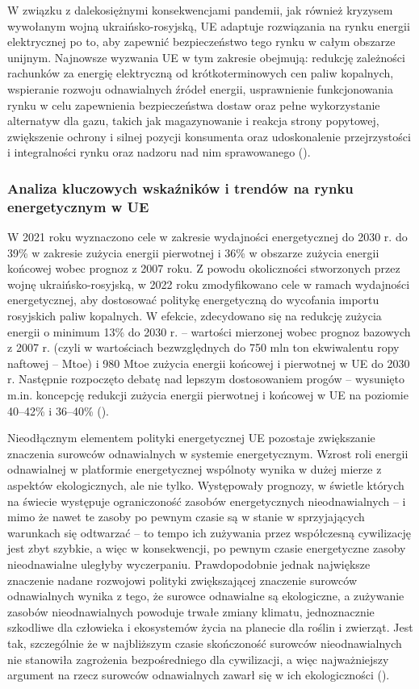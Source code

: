 \documentclass[polish, twoside, 12pt, a4paper]{article}
\theoremstyle{definition}
\theoremstyle{plain}
\theoremstyle{remark}
\begin{document}
W związku z dalekosiężnymi konsekwencjami pandemii, jak również kryzysem wywołanym wojną ukraińsko-rosyjską, UE adaptuje rozwiązania na rynku energii elektrycznej po to, aby zapewnić bezpieczeństwo tego rynku w całym obszarze unijnym. Najnowsze wyzwania UE w tym zakresie obejmują: redukcję zależności rachunków za energię elektryczną od krótkoterminowych cen paliw kopalnych, wspieranie rozwoju odnawialnych źródeł energii, usprawnienie funkcjonowania rynku w celu zapewnienia bezpieczeństwa dostaw oraz pełne wykorzystanie alternatyw dla gazu, takich jak magazynowanie i reakcja strony popytowej, zwiększenie ochrony i silnej pozycji konsumenta oraz udoskonalenie przejrzystości i integralności rynku oraz nadzoru nad nim sprawowanego (\cite{ec2023}). 


\subsubsection{Analiza kluczowych wskaźników i trendów na rynku energetycznym w UE}

W 2021 roku wyznaczono cele w zakresie wydajności energetycznej do 2030 r. do 39\% w zakresie zużycia energii pierwotnej i 36\% w obszarze zużycia energii końcowej wobec prognoz z 2007 roku. Z powodu okoliczności stworzonych przez wojnę ukraińsko-rosyjską, w 2022 roku zmodyfikowano cele w ramach wydajności energetycznej, aby dostosować politykę energetyczną do wycofania importu rosyjskich paliw kopalnych. W efekcie, zdecydowano się na redukcję zużycia energii o minimum 13\% do 2030 r. – wartości mierzonej wobec prognoz bazowych z 2007 r. (czyli w wartościach bezwzględnych do 750 mln ton ekwiwalentu ropy naftowej – Mtoe) i 980 Mtoe zużycia energii końcowej i pierwotnej w UE do 2030 r. Następnie rozpoczęto debatę nad lepszym dostosowaniem progów – wysunięto m.in. koncepcję redukcji zużycia energii pierwotnej i końcowej w UE na poziomie 40–42\% i 36–40\% (\cite{ep2023}).

Nieodłącznym elementem polityki energetycznej UE pozostaje zwiększanie znaczenia surowców odnawialnych w systemie energetycznym. Wzrost roli energii odnawialnej w platformie energetycznej wspólnoty wynika w dużej mierze z aspektów ekologicznych, ale nie tylko. Występowały prognozy, w świetle których na świecie występuje ograniczoność zasobów energetycznych nieodnawialnych – i mimo że nawet te zasoby po pewnym czasie są w stanie w sprzyjających warunkach się odtwarzać – to tempo ich zużywania przez współczesną cywilizację jest zbyt szybkie, a więc w konsekwencji, po pewnym czasie energetyczne zasoby nieodnawialne uległyby wyczerpaniu. Prawdopodobnie jednak największe znaczenie nadane rozwojowi polityki zwiększającej znaczenie surowców odnawialnych wynika z tego, że surowce odnawialne są ekologiczne, a zużywanie zasobów nieodnawialnych powoduje trwałe zmiany klimatu, jednoznacznie szkodliwe dla człowieka i ekosystemów życia na planecie dla roślin i zwierząt. Jest tak, szczególnie że w najbliższym czasie skończoność surowców nieodnawialnych nie stanowiła zagrożenia bezpośredniego dla cywilizacji, a więc najważniejszy argument na rzecz surowców odnawialnych zawarł się w ich ekologiczności (\cite{ep2023}). 
\end{document}
